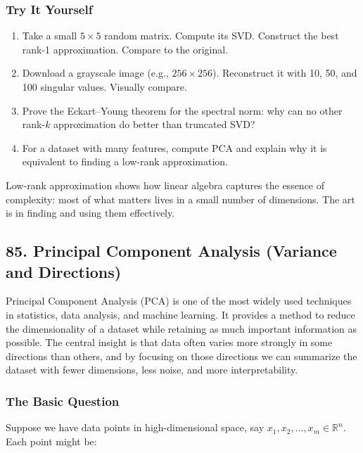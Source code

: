 \documentclass[
  letterpaper,
  DIV=11,
  numbers=noendperiod]{scrreprt}
\providecommand{\tightlist}{%
  \setlength{\itemsep}{0pt}\setlength{\parskip}{0pt}}
\begin{document}
\subsubsection{Try It Yourself}\label{try-it-yourself-83}

\begin{enumerate}
\def\labelenumi{\arabic{enumi}.}
\tightlist
\item
  Take a small \(5 \times 5\) random matrix. Compute its SVD. Construct
  the best rank-1 approximation. Compare to the original.
\item
  Download a grayscale image (e.g., \(256 \times 256\)). Reconstruct it
  with 10, 50, and 100 singular values. Visually compare.
\item
  Prove the Eckart--Young theorem for the spectral norm: why can no
  other rank-\(k\) approximation do better than truncated SVD?
\item
  For a dataset with many features, compute PCA and explain why it is
  equivalent to finding a low-rank approximation.
\end{enumerate}

Low-rank approximation shows how linear algebra captures the essence of
complexity: most of what matters lives in a small number of dimensions.
The art is in finding and using them effectively.

\subsection{85. Principal Component Analysis (Variance and
Directions)}\label{principal-component-analysis-variance-and-directions}

Principal Component Analysis (PCA) is one of the most widely used
techniques in statistics, data analysis, and machine learning. It
provides a method to reduce the dimensionality of a dataset while
retaining as much important information as possible. The central insight
is that data often varies more strongly in some directions than others,
and by focusing on those directions we can summarize the dataset with
fewer dimensions, less noise, and more interpretability.

\subsubsection{The Basic Question}\label{the-basic-question}

Suppose we have data points in high-dimensional space, say
\(x_1, x_2, \dots, x_m \in \mathbb{R}^n\). Each point might be:
\end{document}
